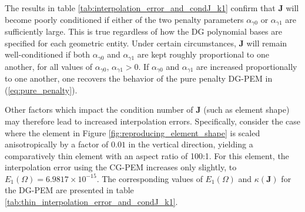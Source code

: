 The results in table \ref{tab:interpolation_error_and_condJ_k1} confirm that $\bm{J}$ will become poorly conditioned if either of the two penalty parameters $\alpha_{\gamma0}$ or $\alpha_{\gamma1}$ are sufficiently large. This is true regardless of how the DG polynomial bases are specified for each geometric entity. Under certain circumstances, $\bm{J}$ will remain well-conditioned if both $\alpha_{\gamma0}$ and $\alpha_{\gamma1}$ are kept roughly proportional to one another, for all values of $\alpha_{\gamma0}, \, \alpha_{\gamma1} > 0$. If $\alpha_{\gamma0}$ and $\alpha_{\gamma1}$ are increased proportionally to one another, one recovers the behavior of the pure penalty DG-PEM in (\ref{eq:pure_penalty}).

Other factors which impact the condition number of $\bm{J}$ (such as element shape) may therefore lead to increased interpolation errors. Specifically, consider the case where the element in Figure \ref{fig:reproducing_element_shape} is scaled anisotropically by a factor of $0.01$ in the vertical direction, yielding a comparatively thin element with an aspect ratio of 100:1. For this element, the interpolation error using the CG-PEM increases only slightly, to $E_1 (\Omega) = 6.9817 \times 10^{-15}$. The corresponding values of $E_1 (\Omega)$ and $\kappa(\bm{J})$ for the DG-PEM are presented in table \ref{tab:thin_interpolation_error_and_condJ_k1}.

